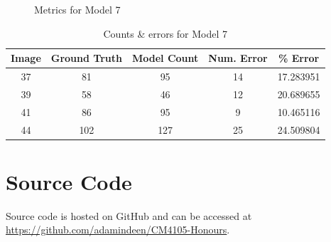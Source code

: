 \begin{appendices}
\begin{figure}[h!]
\caption{Metrics for Model 7}
\end{figure}

\begin{table}[h!]
\centering
\begin{tabular}{||c c c c c||} 
\hline
Image &  Ground Truth &  Model Count &  Num. Error &    \% Error \\
\hline\hline
37 &            81 &           95 &          14 &  17.283951 \\
39 &            58 &           46 &          12 &  20.689655 \\
41 &            86 &           95 &           9 &  10.465116 \\
44 &           102 &          127 &          25 &  24.509804 \\
\hline
\end{tabular}
\caption{Counts \& errors for Model 7}
\label{count_7}
\end{table}

\section{Source Code}
Source code is hosted on GitHub and can be accessed at \url{https://github.com/adamindeen/CM4105-Honours}.


\end{appendices}
